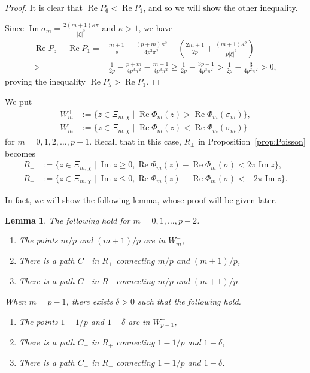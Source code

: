 \documentclass[a4paper,dvipdfmx]{amsart}
\theoremstyle{plain}
\newtheorem{lem}[thm]{Lemma}
\theoremstyle{definition}
\theoremstyle{remark}
\renewcommand{\Re}{\operatorname{Re}}
\renewcommand{\Im}{\operatorname{Im}}
\newcommand{\saddle}{\sigma}
\numberwithin{equation}{section}
\begin{document}
\begin{proof}
It is clear that $\Re{P_{6}}<\Re{P_{1}}$, and so we will show the other inequality.
\par
Since $\Im\saddle_m=\frac{2(m+1)\kappa\pi}{|\xi|^2}$ and $\kappa>1$, we have
\begin{align*}
  \Re{P_{5}}-\Re{P_{1}}
  =&
  \frac{m+1}{p}-\frac{(p+m)\kappa^2}{4p^3\pi^2}
  -
  \left(
    \frac{2m+1}{2p}
    +
    \frac{(m+1)\kappa^2}{p|\xi|^2}
  \right)
  \\
  >&
  \frac{1}{2p}
  -
  \frac{p+m}{4p^3\pi^2}
  -
  \frac{m+1}{4p^3\pi^2}
  \ge
  \frac{1}{2p}-\frac{3p-1}{4p^3\pi^2}
  >
  \frac{1}{2p}-\frac{3}{4p^2\pi^2}
  >0,
\end{align*}
proving the inequality $\Re{P_5}>\Re{P_{1}}$.
\end{proof}
\par
We put
\begin{align*}
  W^{+}_m
  &:=
  \{z\in\Xi_{m,\chi}\mid\Re\Phi_m(z)>\Re\Phi_m(\saddle_m)\},
  \\
  W^{-}_m
  &:=
  \{z\in\Xi_{m,\chi}\mid\Re\Phi_m(z)<\Re\Phi_m(\saddle_m)\}
\end{align*}
for $m=0,1,2,\dots,p-1$.
Recall that in this case, $R_{\pm}$ in Proposition~\ref{prop:Poisson} becomes
\begin{align*}
  R_{+}
  &:=
  \{z\in\Xi_{m,\chi}\mid\Im{z}\ge0,\Re\Phi_m(z)-\Re\Phi_m(\saddle)<2\pi\Im{z}\},
  \\
  R_{-}
  &:=
  \{z\in\Xi_{m,\chi}\mid\Im{z}\le0,\Re\Phi_m(z)-\Re\Phi_m(\saddle)<-2\pi\Im{z}\}.
\end{align*}
\par
In fact, we will show the following lemma, whose proof will be given later.
\begin{lem}\label{lem:Poisson_Phi}
The following hold for $m=0,1,\dots,p-2$.
\begin{enumerate}
\item
The points $m/p$ and $(m+1)/p$ are in $W^{-}_m$,
\item
There is a path $C_{+}$ in $R_{+}$ connecting $m/p$ and $(m+1)/p$,
\item
There is a path $C_{-}$ in $R_{-}$ connecting $m/p$ and $(m+1)/p$.
\end{enumerate}
When $m=p-1$, there exists $\delta>0$ such that the following hold.
\begin{enumerate}
\item
The points $1-1/p$ and $1-\delta$ are in $W^{-}_{p-1}$,
\item
There is a path $C_{+}$ in $R_{+}$ connecting $1-1/p$ and $1-\delta$,
\item
There is a path $C_{-}$ in $R_{-}$ connecting $1-1/p$ and $1-\delta$.
\end{enumerate}
\end{lem}
\end{document}
